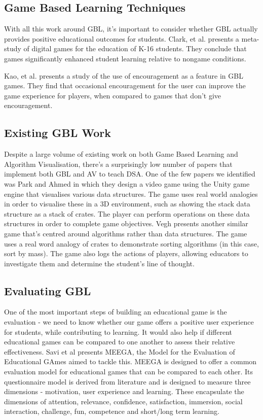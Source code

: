 \documentclass[11pt]{article}
\begin{document}
\subsection{Game Based Learning Techniques}
With all this work around GBL, it's important to consider whether GBL actually provides positive educational outcomes for students. Clark, et al. presents a meta-study of digital games for the education of K-16 students\cite{doi:10.3102/0034654315582065}. They conclude that games significantly enhanced student learning relative to nongame conditions.\par
Kao, et al. presents a study of the use of encouragement as a feature in GBL games. They find that occasional encouragement for the user can improve the game experience for players, when compared to games that don't give encouragement\cite{Kao:2016:EEE:2851581.2892335}.
\subsection{Existing GBL Work}
Despite a large volume of existing work on both Game Based Learning and Algorithm Visualisation, there's a surprisingly low number of papers that implement both GBL and AV to teach DSA. One of the few papers we identified was Park and Ahmed\cite{Park} in which they design a video game using the Unity game engine that visualises various data structures. The game uses real world analogies in order to visualise these in a 3D environment, such as showing the stack data structure as a stack of crates. The player can perform operations on these data structures in order to complete game objectives. Vegh\cite{vegh} presents another similar game that's centred around algorithms rather than data structures. The game uses a real word analogy of crates to demonstrate sorting algorithms (in this case, sort by mass). The game also logs the actions of players, allowing educators to investigate them and determine the student's line of thought.
\subsection{Evaluating GBL}
\label{meegalitrev}
One of the most important steps of building an educational game is the evaluation - we need to know whether our game offers a positive user experience for students, while contributing to learning. It would also help if different educational games can be compared to one another to assess their relative effectiveness. Savi et al presents MEEGA\cite{Rafael}\cite{meegaPlus}, the Model for the Evaluation of Educational GAmes aimed to tackle this. MEEGA is designed to offer a common evaluation model for educational games that can be compared to each other. Its questionnaire model is derived from literature and is designed to measure three dimensions - motivation, user experience and learning. These encapsulate the dimensions of attention, relevance, confidence, satisfaction, immersion, social interaction, challenge, fun, competence and short/long term learning.
\end{document}
